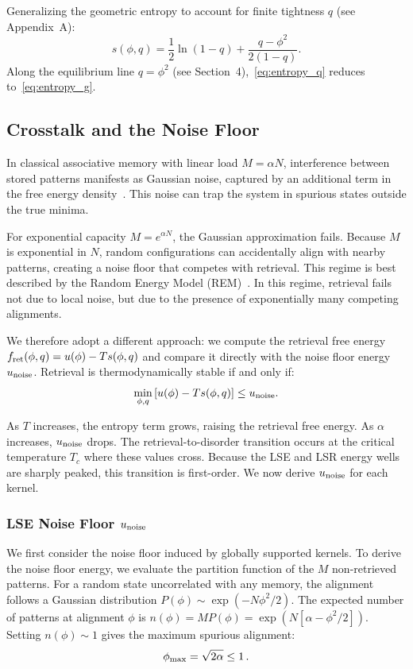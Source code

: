\documentclass{article}
\theoremstyle{plain}
\theoremstyle{definition}
\theoremstyle{remark}
\begin{document}
Generalizing the geometric entropy to account for finite tightness $q$ (see Appendix~A):
\begin{equation}
    s(\phi, q) = \frac{1}{2} \ln(1-q) + \frac{q - \phi^2}{2(1-q)}.
	\label{eq:entropy_q}
\end{equation}
Along the equilibrium line $q = \phi^2$ (see Section~4),~\eqref{eq:entropy_q} reduces to~\eqref{eq:entropy_g}.



\subsection{Crosstalk and the Noise Floor}

In classical associative memory with linear load $M = \alpha N$, interference between stored patterns manifests as Gaussian noise, captured by an additional term in the free energy density~\citep{amit1987statistical}. This noise can trap the system in spurious states outside the true minima.

For exponential capacity $M = e^{\alpha N}$, the Gaussian approximation fails. Because $M$ is exponential in $N$, random configurations can accidentally align with nearby patterns, creating a noise floor that competes with retrieval. This regime is best described by the Random Energy Model (REM)~\citep{derrida1980random}. In this regime, retrieval fails not due to local noise, but due to the presence of exponentially many competing alignments.

We therefore adopt a different approach: we compute the retrieval free energy $f_{\rm ret}(\phi, q) = u(\phi) - T s(\phi, q)$ and compare it directly with the noise floor energy $u_{\rm noise}$. Retrieval is thermodynamically stable if and only if:
\begin{equation}
    \min_{\phi, q} \left[ u(\phi) - T s(\phi, q) \right] \leq u_{\rm noise}.
    \label{eq:stability}
\end{equation}

As $T$ increases, the entropy term grows, raising the retrieval free energy. As $\alpha$ increases, $u_{\rm noise}$ drops. The retrieval-to-disorder transition occurs at the critical temperature $T_c$ where these values cross. Because the LSE and LSR energy wells are sharply peaked, this transition is first-order. We now derive $u_{\rm noise}$ for each kernel.


\subsubsection{LSE Noise Floor $u_{\rm noise}$}
We first consider the noise floor induced by globally supported kernels. To derive the noise floor energy, we evaluate the partition function of the $M$ non-retrieved patterns. For a random state uncorrelated with any memory, the alignment follows a Gaussian distribution $P(\phi) \sim \exp(-N\phi^2/2)$. The expected number of patterns at alignment $\phi$ is $n(\phi) = M P(\phi) = \exp(N[\alpha - \phi^2/2])$. Setting $n(\phi) \sim 1$ gives the maximum spurious alignment:
\begin{equation}
    \phi_{\rm max} = \sqrt{2\alpha} \le 1\,.
    \label{eq:max_spur}
\end{equation}
\end{document}
